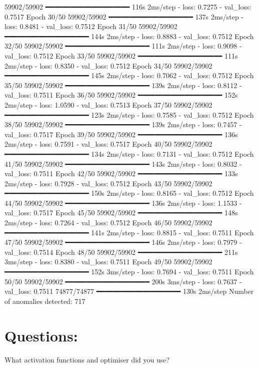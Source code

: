 59902/59902 ━━━━━━━━━━━━━━━━━━━━ 116s 2ms/step - loss: 0.7275 - val_loss: 0.7517
Epoch 30/50
59902/59902 ━━━━━━━━━━━━━━━━━━━━ 137s 2ms/step - loss: 0.8481 - val_loss: 0.7512
Epoch 31/50
59902/59902 ━━━━━━━━━━━━━━━━━━━━ 144s 2ms/step - loss: 0.8883 - val_loss: 0.7512
Epoch 32/50
59902/59902 ━━━━━━━━━━━━━━━━━━━━ 111s 2ms/step - loss: 0.9098 - val_loss: 0.7512
Epoch 33/50
59902/59902 ━━━━━━━━━━━━━━━━━━━━ 111s 2ms/step - loss: 0.8350 - val_loss: 0.7512
Epoch 34/50
59902/59902 ━━━━━━━━━━━━━━━━━━━━ 145s 2ms/step - loss: 0.7062 - val_loss: 0.7512
Epoch 35/50
59902/59902 ━━━━━━━━━━━━━━━━━━━━ 139s 2ms/step - loss: 0.8112 - val_loss: 0.7511
Epoch 36/50
59902/59902 ━━━━━━━━━━━━━━━━━━━━ 152s 2ms/step - loss: 1.0590 - val_loss: 0.7513
Epoch 37/50
59902/59902 ━━━━━━━━━━━━━━━━━━━━ 123s 2ms/step - loss: 0.7585 - val_loss: 0.7512
Epoch 38/50
59902/59902 ━━━━━━━━━━━━━━━━━━━━ 139s 2ms/step - loss: 0.7457 - val_loss: 0.7517
Epoch 39/50
59902/59902 ━━━━━━━━━━━━━━━━━━━━ 136s 2ms/step - loss: 0.7591 - val_loss: 0.7517
Epoch 40/50
59902/59902 ━━━━━━━━━━━━━━━━━━━━ 134s 2ms/step - loss: 0.7131 - val_loss: 0.7512
Epoch 41/50
59902/59902 ━━━━━━━━━━━━━━━━━━━━ 143s 2ms/step - loss: 0.8032 - val_loss: 0.7511
Epoch 42/50
59902/59902 ━━━━━━━━━━━━━━━━━━━━ 133s 2ms/step - loss: 0.7928 - val_loss: 0.7512
Epoch 43/50
59902/59902 ━━━━━━━━━━━━━━━━━━━━ 150s 2ms/step - loss: 0.8165 - val_loss: 0.7512
Epoch 44/50
59902/59902 ━━━━━━━━━━━━━━━━━━━━ 136s 2ms/step - loss: 1.1533 - val_loss: 0.7517
Epoch 45/50
59902/59902 ━━━━━━━━━━━━━━━━━━━━ 148s 2ms/step - loss: 0.7264 - val_loss: 0.7512
Epoch 46/50
59902/59902 ━━━━━━━━━━━━━━━━━━━━ 141s 2ms/step - loss: 0.8815 - val_loss: 0.7511
Epoch 47/50
59902/59902 ━━━━━━━━━━━━━━━━━━━━ 146s 2ms/step - loss: 0.7979 - val_loss: 0.7514
Epoch 48/50
59902/59902 ━━━━━━━━━━━━━━━━━━━━ 211s 3ms/step - loss: 0.8380 - val_loss: 0.7511
Epoch 49/50
59902/59902 ━━━━━━━━━━━━━━━━━━━━ 152s 3ms/step - loss: 0.7694 - val_loss: 0.7511
Epoch 50/50
59902/59902 ━━━━━━━━━━━━━━━━━━━━ 200s 3ms/step - loss: 0.7637 - val_loss: 0.7511
74877/74877 ━━━━━━━━━━━━━━━━━━━━ 130s 2ms/step
Number of anomalies detected: 717

\section*{Questions: }
What activation functions and optimiser did you use?

